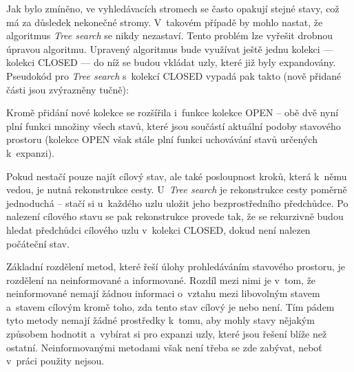 Jak bylo zmíněno, ve vyhledávacích stromech se často opakují stejné stavy, což má za důsledek nekonečné stromy. V~takovém případě by mohlo nastat, že algoritmus \emph{Tree search} se nikdy nezastaví. Tento problém lze vyřešit drobnou úpravou algoritmu. Upravený algoritmus bude využívat ještě jednu kolekci --- kolekci CLOSED --- do níž se budou vkládat uzly, které již byly expandovány. Pseudokód pro \emph{Tree search} s~kolekcí CLOSED vypadá pak takto (nově přidané části jsou zvýrazněny tučně):
Kromě přidání nové kolekce se rozšířila i~funkce kolekce OPEN -- obě dvě nyní plní funkci množiny všech stavů, které jsou součástí aktuální podoby stavového prostoru (kolekce OPEN však stále plní funkci uchovávání stavů určených k~expanzi).

Pokud nestačí pouze najít cílový stav, ale také posloupnost kroků, která k~němu vedou, je nutná rekonstrukce cesty. U~\emph{Tree search} je rekonstrukce cesty poměrně jednoduchá -- stačí si u~každého uzlu uložit jeho bezprostředního předchůdce. Po nalezení cílového stavu se pak rekonstrukce provede tak, že se rekurzivně budou hledat předchůdci cílového uzlu v~kolekci CLOSED, dokud není nalezen počáteční stav.

Základní rozdělení metod, které řeší úlohy prohledáváním stavového prostoru, je rozdělení na neinformované a informované. Rozdíl mezi nimi je v~tom, že neinformované nemají žádnou informaci o~vztahu mezi libovolným stavem a~stavem cílovým kromě toho, zda tento stav cílový je nebo není. Tím pádem tyto metody nemají žádné prostředky k~tomu, aby mohly stavy nějakým způsobem hodnotit a~vybírat si pro expanzi uzly, které jsou řešení blíže než ostatní. Neinformovanými metodami však není třeba se zde zabývat, neboť v~práci použity nejsou. 

